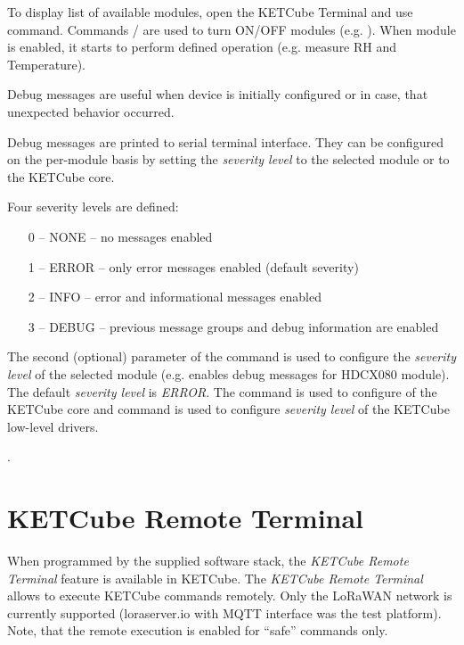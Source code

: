 To display list of available modules, open the KETCube Terminal and use  command. Commands / are used to turn ON/OFF modules (e.g. ). When module is enabled, it starts to perform defined operation (e.g. measure RH and Temperature).

Debug messages are useful when device is initially configured or in case, that unexpected behavior occurred.

Debug messages are printed to serial terminal interface. They can be configured on the per-module basis by setting the {\it severity level} to the selected module or to the KETCube core.

Four severity levels are defined:
\begin{itemize}
  \item[0 --] NONE -- no messages enabled
  \item[1 --] ERROR -- only error messages enabled (default severity)
  \item[2 --] INFO -- error and informational messages enabled
  \item[3 --] DEBUG -- previous message groups and debug information are enabled
\end{itemize}

The second (optional) parameter of the  command is used to configure the {\it severity level} of the selected module (e.g.  enables debug messages for HDCX080 module). The default  {\it severity level} is {\it ERROR}. The command  is used to configure  of the KETCube core and command  is used to configure {\it severity level} of the KETCube low-level drivers.

.

\clearpage 
\section{KETCube Remote Terminal}
When programmed by the supplied software stack, the {\it KETCube Remote Terminal} feature is available in KETCube. The {\it KETCube Remote Terminal} allows to execute KETCube commands remotely. Only the LoRaWAN network is currently supported (loraserver.io with MQTT interface was the test platform). Note, that the remote execution is enabled for ``safe'' commands only.

